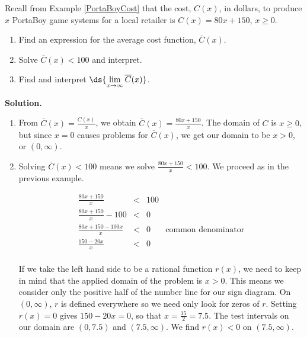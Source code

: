 \documentclass{ximera}
\begin{document}
\begin{example} \label{averagecostapp} Recall from Example \ref {PortaBoyCost} that the cost,  $C(x)$, in dollars, to produce $x$ PortaBoy game systems for a local retailer is $C(x) = 80x + 150$, $x \geq 0$.

\begin{enumerate}

\item  Find an expression for the average cost function, $\overline{C}(x)$. 

\item  \label{costlessthan} Solve $\overline{C}(x) < 100$ and interpret.

\item  Find and interpret $\ds{\lim_{x \rightarrow \infty} \overline{C}(x)}$.


\end{enumerate}

{\bf Solution.}

\begin{enumerate}

\item  From $\overline{C}(x) = \frac{C(x)}{x}$, we obtain $\overline{C}(x) = \frac{80x+150}{x}$.  The domain of $C$ is $x \geq 0$, but since $x=0$ causes problems for $\overline{C}(x)$, we get our domain to be $x>0$, or $(0, \infty)$.

\item  Solving $\overline{C}(x) < 100$ means we solve $\frac{80x+150}{x} < 100$.  We proceed as in the previous example.

\[ \begin{array}{rclr}

 \frac{80x+150}{x} & < & 100 & \\  

 \frac{80x+150}{x} - 100 & < & 0 & \\  

 \frac{80x + 150 - 100x}{x} & < & 0 & \text{common denominator} \\  

 \frac{150 - 20x}{x} & < & 0 & \\

\end{array} \]

If we take the left hand side to be a rational function $r(x)$, we need to keep in mind that the applied domain of the problem is $x > 0$.  This means we consider only the positive half of the number line for our sign diagram.  On $(0, \infty)$, $r$ is defined everywhere so we need only look for zeros of $r$.  Setting $r(x)=0$ gives $150-20x =0$, so that $x = \frac{15}{2}= 7.5$.  The test intervals on our domain are $(0, 7.5)$ and $(7.5, \infty)$.  We find $r(x) < 0$ on $(7.5, \infty)$.  


\end{enumerate}
\end{example}
\end{document}
